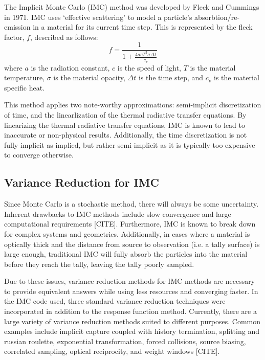 \documentclass[]{article}
\begin{document}
		The Implicit Monte Carlo (IMC) method was developed by Fleck and Cummings in 1971. IMC uses `effective scattering' to model a particle's absorbtion/re-emission in a material for its current time step. This is represented by the fleck factor, $f$, described as follows:
		\begin{equation}
			f = \frac{1}{1 + \frac{4acT^{3}\sigma \Delta t}{c_{v}}}
		\end{equation}
		where $a$ is the radiation constant, $c$ is the speed of light, $T$ is the material temperature, $\sigma$ is the material opacity, $\Delta t$ is the time step, and $c_{v}$ is the material specific heat.
		
		This method applies two note-worthy approximations: semi-implicit discretization of time, and the linearlization of the thermal radiative transfer equations. By linearizing the thermal radiative transfer equations, IMC is known to lead to inaccurate or non-physical results. Additionally, the time discretization is not fully implicit as implied, but rather semi-implicit as it is typically too expensive to converge otherwise. 
			
	\subsection{Variance Reduction for IMC}
		Since Monte Carlo is a stochastic method, there will always be some uncertainty. Inherent drawbacks to IMC methods include slow convergence and large computational requirements [CITE]. Furthermore, IMC is known to break down for complex systems and geometries. Additionally, in cases where a material is optically thick and the distance from source to observation (i.e. a tally surface) is large enough, traditional IMC will fully absorb the particles into the material before they reach the tally, leaving the tally poorly sampled.
		
		Due to these issues, variance reduction methods for IMC methods are necessary to provide equivalent answers while using less resources and converging faster. In the IMC code used, three standard variance reduction techniques were incorporated in addition to the response function method. Currently, there are a large variety of variance reduction methods suited to different purposes. Common examples include implicit capture coupled with history termination, splitting and russian roulette, exponential transformation, forced collisions, source biasing, correlated sampling, optical reciprocity, and weight windows [CITE]. 
		
\end{document}
